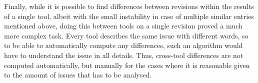 Finally, while it is possible to find differences between revisions within the
results of a single tool, albeit with the small instability in case of multiple
similar entries mentioned above, doing this between tools on a single revision
proved a much more complex task. Every tool describes the same issue with
different words, so to be able to automatically compute any differences, such
an algorithm would have to understand the issue in all details. Thus,
   cross-tool differences are not computed automatically, but manually for the
   cases where it is reasonable given to the amount of issues that has to be
   analysed.
